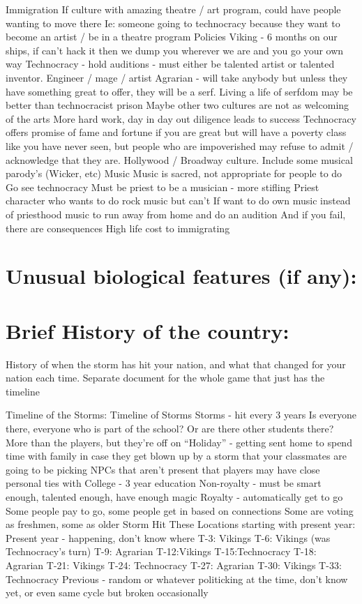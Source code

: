 \documentclass[blue]{GL2020}
\begin{document}
Immigration
If culture with amazing theatre / art program, could have people wanting to move there
Ie: someone going to technocracy because they want to become an artist / be in a theatre program
Policies
Viking - 6 months on our ships, if can’t hack it then we dump you wherever we are and you go your own way
Technocracy - hold auditions - must either be talented artist or talented inventor.  Engineer / mage / artist
Agrarian - will take anybody but unless they have something great to offer, they will be a serf.  Living a life of serfdom may be better than technocracist prison
Maybe other two cultures are not as welcoming of the arts
More hard work, day in day out diligence leads to success
Technocracy offers promise of fame and fortune if you are great but will have a poverty class like you have never seen, but people who are impoverished may refuse to admit / acknowledge that they are.  Hollywood / Broadway culture.  Include some musical parody’s (Wicker, etc)
Music
Music is sacred, not appropriate for people to do
Go see technocracy 
Must be priest to be a musician - more stifling
Priest character who wants to do rock music but can’t
If want to do own music instead of priesthood music to run away from home and do an audition
And if you fail, there are consequences
High life cost to immigrating

\section{Unusual biological features (if any):}

\section{Brief History of the country:}

History of when the storm has hit your nation, and what that changed for your nation each time.
Separate document for the whole game that just has the timeline

Timeline of the Storms:
Timeline of Storms
Storms - hit every 3 years
Is everyone there, everyone who is part of the school?  Or are there other students there?
More than the players, but they’re off on “Holiday” - getting sent home to spend time with family in case they get blown up by a storm that your classmates are going to be picking
NPCs that aren’t present that players may have close personal ties with
College - 3 year education
Non-royalty - must be smart enough, talented enough, have enough magic
Royalty - automatically get to go
Some people pay to go, some people get in based on connections
Some are voting as freshmen, some as older
Storm Hit These Locations starting with present year:
Present year - happening, don’t know where
T-3: Vikings
T-6: Vikings (was Technocracy’s turn)
T-9: Agrarian
T-12:Vikings
T-15:Technocracy
T-18: Agrarian
T-21: Vikings
T-24: Technocracy
T-27: Agrarian
T-30: Vikings
T-33: Technocracy
Previous - random or whatever politicking at the time, don’t know yet, or even same cycle but broken occasionally
\end{document}
